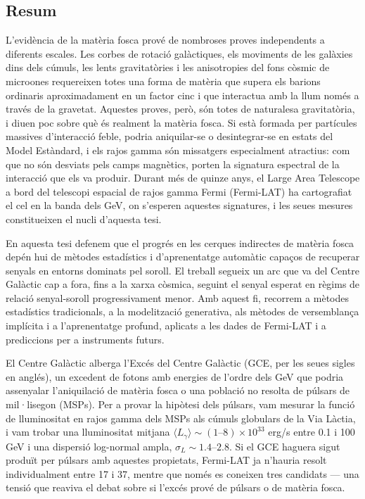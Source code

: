 \begin{otherlanguage}{catalan}
\chapter*{Resum}

L'evidència de la matèria fosca prové de nombroses proves independents a diferents escales. Les corbes de rotació galàctiques, els moviments de les galàxies dins dels cúmuls, les lents gravitatòries i les anisotropies del fons còsmic de microones requereixen totes una forma de matèria que supera els barions ordinaris aproximadament en un factor cinc i que interactua amb la llum només a través de la gravetat. Aquestes proves, però, són totes de naturalesa gravitatòria, i diuen poc sobre què és realment la matèria fosca. Si està formada per partícules massives d'interacció feble, podria aniquilar-se o desintegrar-se en estats del Model Estàndard, i els rajos gamma són missatgers especialment atractius: com que no són desviats pels camps magnètics, porten la signatura espectral de la interacció que els va produir. Durant més de quinze anys, el Large Area Telescope a bord del telescopi espacial de rajos gamma Fermi (Fermi-LAT) ha cartografiat el cel en la banda dels GeV, on s'esperen aquestes signatures, i les seues mesures constitueixen el nucli d'aquesta tesi.

En aquesta tesi defenem que el progrés en les cerques indirectes de matèria fosca depén hui de mètodes estadístics i d'aprenentatge automàtic capaços de recuperar senyals en entorns dominats pel soroll. El treball segueix un arc que va del Centre Galàctic cap a fora, fins a la xarxa còsmica, seguint el senyal esperat en règims de relació senyal-soroll progressivament menor. Amb aquest fi, recorrem a mètodes estadístics tradicionals, a la modelització generativa, als mètodes de versemblança implícita i a l'aprenentatge profund, aplicats a les dades de Fermi-LAT i a prediccions per a instruments futurs.

El Centre Galàctic alberga l'Excés del Centre Galàctic (GCE, per les seues sigles en anglés), un excedent de fotons amb energies de l'ordre dels GeV que podria assenyalar l'aniquilació de matèria fosca o una població no resolta de púlsars de mil·lisegon (MSPs). Per a provar la hipòtesi dels púlsars, vam mesurar la funció de lluminositat en rajos gamma dels MSPs als cúmuls globulars de la Via Làctia, i vam trobar una lluminositat mitjana $\langle L_\gamma\rangle \sim (1\text{--}8)\times10^{33}$ erg/s entre 0.1 i 100 GeV i una dispersió log-normal ampla, $\sigma_L \sim 1.4\text{--}2.8$. Si el GCE haguera sigut produït per púlsars amb aquestes propietats, Fermi-LAT ja n'hauria resolt individualment entre 17 i 37, mentre que només es coneixen tres candidats --- una tensió que reaviva el debat sobre si l'excés prové de púlsars o de matèria fosca.


\end{otherlanguage}
